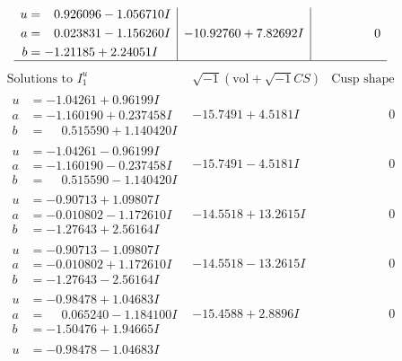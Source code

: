 \documentclass[1p]{elsarticle_modified}
\theoremstyle{definition}
\newcommand{\I}{\sqrt{-1}}
\begin{document}
$$\begin{array}{c|c|c}
\begin{aligned}
u &= \phantom{-}0.926096 - 1.056710 I \\
a &= \phantom{-}0.023831 - 1.156260 I \\
b &= -1.21185 + 2.24051 I\end{aligned}
 & -10.92760 + 7.82692 I & \phantom{-0.000000 } 0\\
 \hline 
 \end{array}$$\newpage$$\begin{array}{c|c|c}  
\text{Solutions to }I^u_{1}& \I (\text{vol} + \sqrt{-1}CS) & \text{Cusp shape}\\
 \hline 
\begin{aligned}
u &= -1.04261 + 0.96199 I \\
a &= -1.160190 + 0.237458 I \\
b &= \phantom{-}0.515590 + 1.140420 I\end{aligned}
 & -15.7491 + 4.5181 I & \phantom{-0.000000 } 0 \\ \hline\begin{aligned}
u &= -1.04261 - 0.96199 I \\
a &= -1.160190 - 0.237458 I \\
b &= \phantom{-}0.515590 - 1.140420 I\end{aligned}
 & -15.7491 - 4.5181 I & \phantom{-0.000000 } 0 \\ \hline\begin{aligned}
u &= -0.90713 + 1.09807 I \\
a &= -0.010802 - 1.172610 I \\
b &= -1.27643 + 2.56164 I\end{aligned}
 & -14.5518 + 13.2615 I & \phantom{-0.000000 } 0 \\ \hline\begin{aligned}
u &= -0.90713 - 1.09807 I \\
a &= -0.010802 + 1.172610 I \\
b &= -1.27643 - 2.56164 I\end{aligned}
 & -14.5518 - 13.2615 I & \phantom{-0.000000 } 0 \\ \hline\begin{aligned}
u &= -0.98478 + 1.04683 I \\
a &= \phantom{-}0.065240 - 1.184100 I \\
b &= -1.50476 + 1.94665 I\end{aligned}
 & -15.4588 + 2.8896 I & \phantom{-0.000000 } 0 \\ \hline\begin{aligned}
u &= -0.98478 - 1.04683 I \\

\end{aligned}
\end{array}$$
\end{document}
